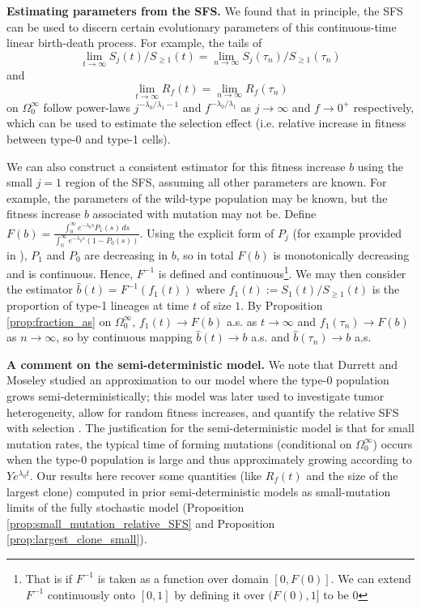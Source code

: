 \documentclass{article}
\numberwithin{equation}{section}
\begin{document}
\textbf{Estimating parameters from the SFS.} We found that in principle, the SFS can be used to discern certain evolutionary parameters of this continuous-time linear birth-death process. For example, the tails of 
$$\lim_{t\to\infty}S_j(t)/S_{\geq 1}(t)=\lim_{n\to\infty}S_j(\tau_n)/S_{\geq 1}(\tau_n)
$$ and 
$$\lim_{t\to\infty}R_f(t)=\lim_{n\to\infty}R_f(\tau_n)$$
on $\Omega_0^\infty$ follow power-laws $j^{-\lambda_0/\lambda_1-1}$ and $f^{-\lambda_0/\lambda_1}$ as $j\to\infty$ and $f\to 0^+$ respectively, which can be used to estimate the selection effect (i.e. relative increase in fitness between type-0 and type-1 cells).  

We can also construct a consistent estimator for this fitness increase $b$ using the small $j=1$ region of the SFS, assuming all other parameters are known. For example, the parameters of the wild-type population may be known, but the fitness increase $b$ associated with mutation may not be. Define $F(b)=\frac{\int_0^\infty e^{-\lambda_0 s}P_1(s)\,ds}{\int_0^{\infty}e^{-\lambda_0 s}(1-P_0(s))}$. Using the explicit form of $P_j$ (for example provided in \cite{durrettbranching2015}), $P_1$ and $P_0$ are decreasing in $b$, so in total $F(b)$ is monotonically decreasing and is continuous. Hence, $F^{-1}$ is defined and continuous\footnote{That is if $F^{-1}$ is taken as a function over domain $[0,F(0)]$. We can extend $F^{-1}$ continuously onto $[0,1]$ by defining it over $(F(0),1]$ to be $0$}. We may then consider the estimator $\widehat{b}(t)=F^{-1}(f_1(t))$ where $f_1(t):=S_1(t)/S_{\geq 1}(t)$ is the proportion of type-1 lineages at time $t$ of size $1$. By Proposition \ref{prop:fraction_as} on $\Omega_0^\infty$, $f_1(t)\to F(b)$ a.s. as $t\to\infty$ and $f_1(\tau_n)\to F(b)$ as $n\to\infty$, so by continuous mapping $\widehat{b}(t)\to b$ a.s. and $\widehat{b}(\tau_n)\to b$ a.s.

\textbf{A comment on the semi-deterministic model.} We note that Durrett and Moseley \cite{durrett2010} studied an approximation to our model where the type-0 population grows semi-deterministically; this model was later used to investigate tumor heterogeneity, allow for random fitness increases, and quantify the relative SFS with selection \cite{durrett2010,durrettfoo2010,durrett2013,tung}. The justification for the semi-deterministic model is that for small mutation rates, the typical time of forming mutations (conditional on $\Omega_0^\infty$) occurs when the type-0 population is large and thus approximately growing according to $Ye^{\lambda_0 t}$. Our results here recover some quantities (like $R_f(t)$ and the size of the largest clone) computed in prior semi-deterministic models as small-mutation limits of the fully stochastic model (Proposition \ref{prop:small_mutation_relative_SFS} and Proposition \ref{prop:largest_clone_small}).
\end{document}
